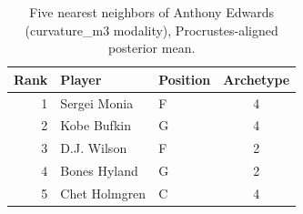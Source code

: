 \begin{table}[htbp]
  \centering\small
  \begin{tabular}{rllc}
    \toprule
    Rank & Player & Position & Archetype \\
    \midrule
    1 & Sergei Monia & F & 4 \\
    2 & Kobe Bufkin & G & 4 \\
    3 & D.J. Wilson & F & 2 \\
    4 & Bones Hyland & G & 2 \\
    5 & Chet Holmgren & C & 4 \\
    \bottomrule
  \end{tabular}
  \caption{Five nearest neighbors of Anthony Edwards (curvature_m3 modality), Procrustes-aligned posterior mean.}
  \label{tab:Anthony_Edwards_neighbors_curvature_m3}
\end{table}

